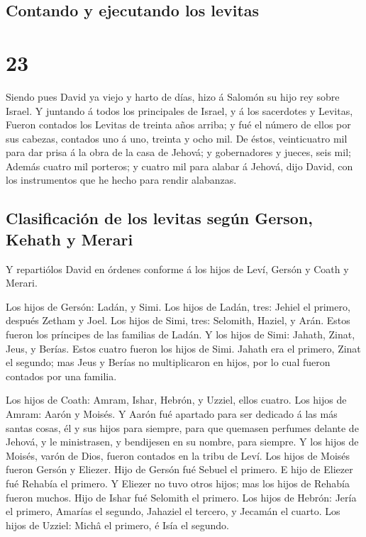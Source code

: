\hypertarget{contando-y-ejecutando-los-levitas}{%
\subsection{Contando y ejecutando los
levitas}\label{contando-y-ejecutando-los-levitas}}

\hypertarget{section-22}{%
\section{23}\label{section-22}}

 Siendo pues David ya viejo y harto de días, hizo á Salomón
su hijo rey sobre Israel.  Y juntando á todos los
principales de Israel, y á los sacerdotes y Levitas,  Fueron
contados los Levitas de treinta años arriba; y fué el número de ellos
por sus cabezas, contados uno á uno, treinta y ocho mil.  De
éstos, veinticuatro mil para dar prisa á la obra de la casa de Jehová; y
gobernadores y jueces, seis mil;  Además cuatro mil
porteros; y cuatro mil para alabar á Jehová, dijo David, con los
instrumentos que he hecho para rendir alabanzas.

\hypertarget{clasificaciuxf3n-de-los-levitas-seguxfan-gerson-kehath-y-merari}{%
\subsection{Clasificación de los levitas según Gerson, Kehath y
Merari}\label{clasificaciuxf3n-de-los-levitas-seguxfan-gerson-kehath-y-merari}}

 Y repartiólos David en órdenes conforme á los hijos de
Leví, Gersón y Coath y Merari.

 Los hijos de Gersón: Ladán, y Simi.  Los hijos
de Ladán, tres: Jehiel el primero, después Zetham y Joel. 
Los hijos de Simi, tres: Selomith, Haziel, y Arán. Estos fueron los
príncipes de las familias de Ladán.  Y los hijos de Simi:
Jahath, Zinat, Jeus, y Berías. Estos cuatro fueron los hijos de Simi.
 Jahath era el primero, Zinat el segundo; mas Jeus y Berías
no multiplicaron en hijos, por lo cual fueron contados por una familia.

 Los hijos de Coath: Amram, Ishar, Hebrón, y Uzziel, ellos
cuatro.  Los hijos de Amram: Aarón y Moisés. Y Aarón fué
apartado para ser dedicado á las más santas cosas, él y sus hijos para
siempre, para que quemasen perfumes delante de Jehová, y le ministrasen,
y bendijesen en su nombre, para siempre.  Y los hijos de
Moisés, varón de Dios, fueron contados en la tribu de Leví.
 Los hijos de Moisés fueron Gersón y Eliezer. 
Hijo de Gersón fué Sebuel el primero.  E hijo de Eliezer
fué Rehabía el primero. Y Eliezer no tuvo otros hijos; mas los hijos de
Rehabía fueron muchos.  Hijo de Ishar fué Selomith el
primero.  Los hijos de Hebrón: Jería el primero, Amarías el
segundo, Jahaziel el tercero, y Jecamán el cuarto.  Los
hijos de Uzziel: Michâ el primero, é Isía el segundo.

